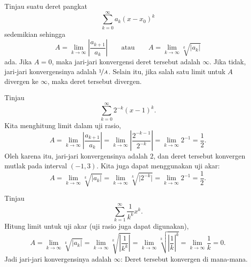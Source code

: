 \begin{theorem}
Tinjau suatu deret pangkat
\begin{equation*}
\sum_{k=0}^\infty a_k {(x-x_0)}^k
\end{equation*}
sedemikian sehingga
\begin{equation*}
A =
\lim_{k\to\infty}
\left \lvert
\frac{a_{k+1}}{a_k}
\right \rvert
\qquad \text{atau} \qquad
A =
\lim_{k\to\infty} \sqrt[k]{\lvert a_k \rvert}
\end{equation*}
ada. Jika $A = 0$, maka jari-jari konvergensi deret tersebut
adalah $\infty$. Jika tidak, jari-jari konvergensinya adalah $\nicefrac{1}{A}$.
Selain itu, jika salah satu limit untuk 
$A$ divergen ke $\infty$, maka deret tersebut divergen.
\pagebreak[3]
\end{theorem}

\begin{example}
Tinjau
\begin{equation*}
\sum_{k=0}^\infty 2^{-k} {(x-1)}^k .
\end{equation*}
Kita menghitung limit dalam uji rasio,
\begin{equation*}
A = \lim_{k\to\infty} 
\left \lvert
\frac{a_{k+1}}{a_k}
\right \rvert
=
\lim_{k\to\infty} 
\left \lvert
\frac{2^{-k-1}}{2^{-k}}
\right \rvert
=
\lim_{k\to\infty} 
2^{-1} = \frac{1}{2}.
\end{equation*}
Oleh karena itu, jari-jari konvergensinya adalah $2$, dan deret tersebut
konvergen mutlak pada interval $(-1,3)$.
Kita juga dapat menggunakan uji akar:
\begin{equation*}
A = 
\lim_{k\to\infty} 
\sqrt[k]{\lvert
a_k
\rvert}
=
\lim_{k\to\infty} 
\sqrt[k]{\lvert
2^{-k}
\rvert}
=
\lim_{k\to\infty} 
2^{-1}
=
\frac{1}{2}.
\end{equation*}
\end{example}

\begin{example}
Tinjau
\begin{equation*}
\sum_{k=1}^\infty \frac{1}{k^k} {x}^k .
\end{equation*}
Hitung limit untuk uji akar (uji rasio juga dapat digunakan),
\begin{equation*}
A =
\lim_{k\to\infty} 
\sqrt[k]{\lvert a_k \rvert}
=
\lim_{k\to\infty} 
\sqrt[k]{
\left\lvert\frac{1}{k^k}\right\rvert}
=
\lim_{k\to\infty} 
\sqrt[k]{
{\left\lvert\frac{1}{k}\right\rvert}^{k}}
=
\lim_{k\to\infty} 
\frac{1}{k}
=
0 .
\end{equation*}
Jadi jari-jari konvergensinya adalah $\infty$: Deret tersebut
konvergen di mana-mana. %
\end{example}

